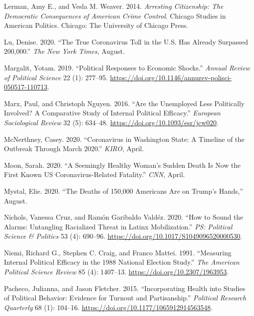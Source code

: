 \documentclass[
  12pt,
]{article}
\newlength{\cslhangindent}
\newlength{\cslentryspacingunit} %
\newenvironment{CSLReferences}[2] %
 {%
  \setlength{\parindent}{0pt}
  \ifodd #1
  \let\oldpar\par
  \def\par{\hangindent=\cslhangindent\oldpar}
  \fi
  \setlength{\parskip}{#2\cslentryspacingunit}
 }%
 {}
\begin{document}
\begin{CSLReferences}{1}{0}
\leavevmode{}%
Lerman, Amy E., and Vesla M. Weaver. 2014. \emph{Arresting Citizenship: The Democratic Consequences of {American} Crime Control}. Chicago Studies in {American} Politics. {Chicago}: {The University of Chicago Press}.

\leavevmode{}%
Lu, Denise. 2020. {``The {True Coronavirus Toll} in the {U}.{S}. {Has Already Surpassed} 200,000.''} \emph{The New York Times}, August.

\leavevmode{}%
Margalit, Yotam. 2019. {``Political {Responses} to {Economic Shocks}.''} \emph{Annual Review of Political Science} 22 (1): 277--95. \url{https://doi.org/10.1146/annurev-polisci-050517-110713}.

\leavevmode{}%
Marx, Paul, and Christoph Nguyen. 2016. {``Are the {Unemployed Less Politically Involved}? {A Comparative Study} of {Internal Political Efficacy}.''} \emph{European Sociological Review} 32 (5): 634--48. \url{https://doi.org/10.1093/esr/jcw020}.

\leavevmode{}%
McNerthney, Casey. 2020. {``Coronavirus in {Washington} State: {A} Timeline of the Outbreak Through {March} 2020.''} \emph{KIRO}, April.

\leavevmode{}%
Moon, Sarah. 2020. {``A Seemingly Healthy Woman's Sudden Death Is Now the First Known {US} Coronavirus-Related Fatality.''} \emph{CNN}, April.

\leavevmode{}%
Mystal, Elie. 2020. {``The {Deaths} of 150,000 {Americans Are} on {Trump}'s {Hands},''} August.

\leavevmode{}%
Nichols, Vanessa Cruz, and Ramón Garibaldo Valdéz. 2020. {``How to {Sound} the {Alarms}: {Untangling Racialized Threat} in {Latinx Mobilization}.''} \emph{PS: Political Science \& Politics} 53 (4): 690--96. \url{https://doi.org/10.1017/S1049096520000530}.

\leavevmode{}%
Niemi, Richard G., Stephen C. Craig, and Franco Mattei. 1991. {``Measuring {Internal Political Efficacy} in the 1988 {National Election Study}.''} \emph{The American Political Science Review} 85 (4): 1407--13. \url{https://doi.org/10.2307/1963953}.

\leavevmode{}%
Pacheco, Julianna, and Jason Fletcher. 2015. {``Incorporating {Health} into {Studies} of {Political Behavior}: {Evidence} for {Turnout} and {Partisanship}.''} \emph{Political Research Quarterly} 68 (1): 104--16. \url{https://doi.org/10.1177/1065912914563548}.


\end{CSLReferences}
\end{document}
